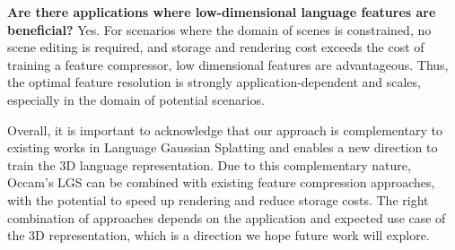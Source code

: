 \noindent\textbf{Are there applications where low-dimensional language features are beneficial?} Yes. For scenarios where the domain of scenes is constrained, no scene editing is required, and storage and rendering cost exceeds the cost of training a feature compressor, low dimensional features are advantageous. Thus, the optimal feature resolution is strongly application-dependent and scales, especially in the domain of potential scenarios.

Overall, it is important to acknowledge that our approach is complementary to existing works in Language Gaussian Splatting and enables a new direction to train the 3D language representation. Due to this complementary nature, Occam's LGS can be combined with existing feature compression approaches, with the potential to speed up rendering and reduce storage costs. The right combination of approaches depends on the application and expected use case of the 3D representation, which is a direction we hope future work will explore.